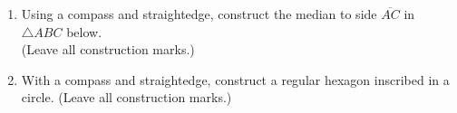 \documentclass[12pt, twoside]{article}
\begin{document}
\begin{enumerate}
\newpage

    \item Using  a  compass  and  straightedge,  construct  the  median  to  side $\overline{AC}$ in $\triangle ABC$ below.\\ (Leave all construction marks.)
      \vspace{1cm}
    \begin{center}
    \end{center}

      \vspace{2cm}

    \item With a compass and straightedge, construct a regular hexagon inscribed in a circle. (Leave all construction marks.)




  \end{enumerate}

  
\end{document}
